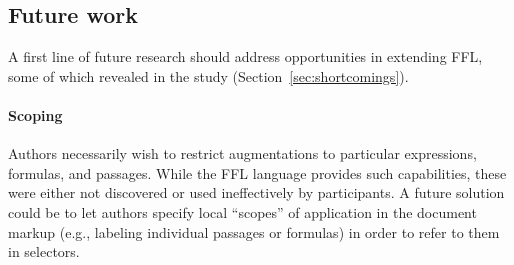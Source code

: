 



\subsection{Future work}

A first line of future research should address opportunities in extending FFL, some of which revealed in the study (Section~\ref{sec:shortcomings}).

\paragraph{Scoping} Authors necessarily wish to restrict augmentations to particular expressions, formulas, and passages. While the FFL language provides such capabilities, these were either not discovered or used ineffectively by participants. A future solution could be to let authors specify local ``scopes'' of application in the document markup (e.g., labeling individual passages or formulas) in order to refer to them in selectors.

